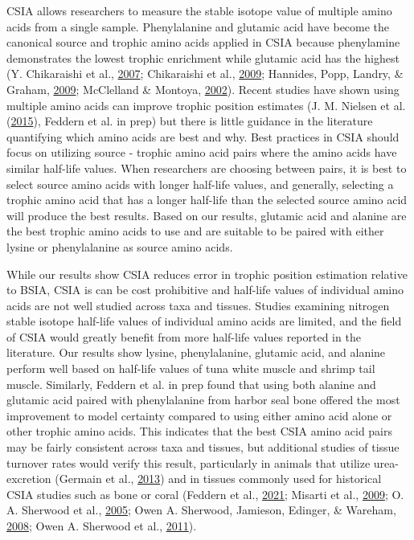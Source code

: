 \documentclass [11pt, proquest] {uwthesis}[2015/03/03]
\begin{document}
CSIA allows researchers to measure the stable isotope value of multiple
amino acids from a single sample. Phenylalanine and glutamic acid have
become the canonical source and trophic amino acids applied in CSIA
because phenylamine demonstrates the lowest trophic enrichment while
glutamic acid has the highest (Y. Chikaraishi et al.,
\protect\hyperlink{ref-Chikaraishi2007}{2007}; Chikaraishi et al.,
\protect\hyperlink{ref-Chikaraishi2009}{2009}; Hannides, Popp, Landry,
\& Graham, \protect\hyperlink{ref-Hannides2009}{2009}; McClelland \&
Montoya, \protect\hyperlink{ref-McClelland2002}{2002}). Recent studies
have shown using multiple amino acids can improve trophic position
estimates (J. M. Nielsen et al.
(\protect\hyperlink{ref-Nielsen2015}{2015}), Feddern et al. in prep) but
there is little guidance in the literature quantifying which amino acids
are best and why. Best practices in CSIA should focus on utilizing
source - trophic amino acid pairs where the amino acids have similar
half-life values. When researchers are choosing between pairs, it is
best to select source amino acids with longer half-life values, and
generally, selecting a trophic amino acid that has a longer half-life
than the selected source amino acid will produce the best results. Based
on our results, glutamic acid and alanine are the best trophic amino
acids to use and are suitable to be paired with either lysine or
phenylalanine as source amino acids.

While our results show CSIA reduces error in trophic position estimation
relative to BSIA, CSIA is can be cost prohibitive and half-life values
of individual amino acids are not well studied across taxa and tissues.
Studies examining nitrogen stable isotope half-life values of individual
amino acids are limited, and the field of CSIA would greatly benefit
from more half-life values reported in the literature. Our results show
lysine, phenylalanine, glutamic acid, and alanine perform well based on
half-life values of tuna white muscle and shrimp tail muscle. Similarly,
Feddern et al. in prep found that using both alanine and glutamic acid
paired with phenylalanine from harbor seal bone offered the most
improvement to model certainty compared to using either amino acid alone
or other trophic amino acids. This indicates that the best CSIA amino
acid pairs may be fairly consistent across taxa and tissues, but
additional studies of tissue turnover rates would verify this result,
particularly in animals that utilize urea-excretion (Germain et al.,
\protect\hyperlink{ref-Germain2013}{2013}) and in tissues commonly used
for historical CSIA studies such as bone or coral (Feddern et al.,
\protect\hyperlink{ref-Feddern2021}{2021}; Misarti et al.,
\protect\hyperlink{ref-Misarti2009}{2009}; O. A. Sherwood et al.,
\protect\hyperlink{ref-Sherwood2005}{2005}; Owen A. Sherwood, Jamieson,
Edinger, \& Wareham, \protect\hyperlink{ref-Sherwood2008}{2008}; Owen A.
Sherwood et al., \protect\hyperlink{ref-Sherwood2011}{2011}).
\end{document}

